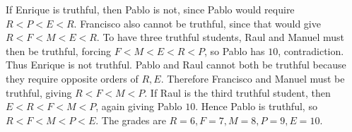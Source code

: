 If Enrique is truthful, then Pablo is not, since Pablo would require $R<P<E<R$. Francisco also cannot be truthful, since that would give $R<F<M<E<R$. To have three truthful students, Raul and Manuel must then be truthful, forcing $F<M<E<R<P$, so Pablo has $10$, contradiction. Thus Enrique is not truthful. Pablo and Raul cannot both be truthful because they require opposite orders of $R,E$. Therefore Francisco and Manuel must be truthful, giving $R<F<M<P$. If Raul is the third truthful student, then $E<R<F<M<P$, again giving Pablo $10$. Hence Pablo is truthful, so $R<F<M<P<E$. The grades are $\boxed{R=6,F=7,M=8,P=9,E=10}$.
